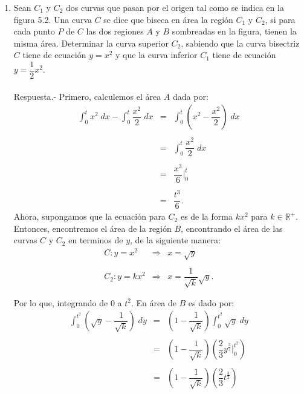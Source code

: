 \begin{enumerate}[\bfseries 1.]
    \item Sean $C_1$ y $C_2$ dos curvas que pasan por el origen tal como se indica en la figura 5.2. Una curva $C$ se dice que biseca en área la región $C_1$ y $C_2$, si para cada punto $P$ de $C$ las dos regiones $A$ y $B$ sombreadas en la figura, tienen la misma área. Determinar la curva superior $C_2$, sabiendo que la curva bisectriz $C$ tiene de ecuación $y=x^2$ y que la curva inferior $C_1$ tiene de ecuación $y=\dfrac{1}{2}x^2.$\\\\
	Respuesta.-\; Primero, calculemos el área $A$ dada por:
	$$
	\begin{array}{rcl}
	    \displaystyle\int_0^t x^2\; dx - \int_0^t \dfrac{x^2}{2}\;dx &=& \displaystyle\int_0^t\left(x^2-\dfrac{x^2}{2}\right)\; dx\\\\
									 &=& \displaystyle\int_0^t\dfrac{x^2}{2}\; dx\\\\
									 &=& \dfrac{x^3}{6}\Bigg|_0^t\\\\
									 &=& \dfrac{t^3}{6}.
	\end{array}
	$$
	Ahora, supongamos que la ecuación para $C_2$ es de la forma $kx^2$ para $k\in \mathbb{R}^+$. Entonces, encontremos el área de la región $B$, encontrando el área de las curvas $C$ y $C_2$ en terminos de $y$, de la siguiente manera:
	$$
	\begin{array}{rcl}
	    C:y=x^2 &\Rightarrow & x=\sqrt{y}\\\\
	    C_2:y=kx^2 &\Rightarrow & x=\dfrac{1}{\sqrt{k}}\sqrt{y}.\\\\
	\end{array}
	$$
	Por lo que, integrando de $0$ a $t^2$. En área de $B$ es dado por:
	$$
	\begin{array}{rcl}
	    \displaystyle\int_0^{t^2}\left(\sqrt{y}-\dfrac{1}{\sqrt{k}}\right)\; dy &=& \left(1-\dfrac{1}{\sqrt{k}}\right)\displaystyle\int_0^{t^2} \sqrt{y}\; dy\\\\
										    &=& \left(1-\dfrac{1}{\sqrt{k}}\right)\left(\dfrac{2}{3}y^{\frac{3}{2}}\bigg|_0^{t^2}\right)\\\\
										    &=& \left(1-\dfrac{1}{\sqrt{k}}\right)\left(\dfrac{2}{3}t^{\frac{3}{2}}\right)\\\\

\end{array}$$
\end{enumerate}
